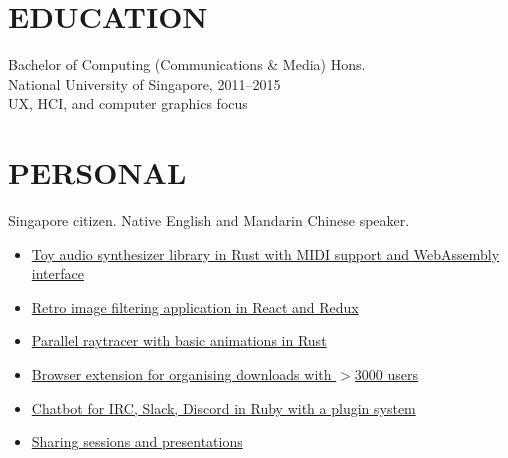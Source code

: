 \documentclass[line, margin]{res}
\begin{document}
\begin{resume}


    \section{EDUCATION}
        Bachelor of Computing (Communications \& Media) Hons. \\
        National University of Singapore, 2011--2015 \\
        UX, HCI, and computer graphics focus

    \section{PERSONAL}
        Singapore citizen. Native English and Mandarin Chinese speaker.
        \vspace{0.075cm}
        \begin{itemize}[leftmargin=*]
        \itemsep0em 
        \item \href{https://github.com/gyng/synthrs}{Toy audio synthesizer library in Rust with MIDI support and WebAssembly interface}
        \item \href{https://github.com/gyng/ditherer}{Retro image filtering application in React and Redux}
        \item \href{https://github.com/gyng/rust-raytracer}{Parallel raytracer with basic animations in Rust}
        \item \href{https://github.com/gyng/save-in}{Browser extension for organising downloads with $>$3000 users}
        \item \href{https://github.com/gyng/betabot}{Chatbot for IRC, Slack, Discord in Ruby with a plugin system}
        \item \href{https://github.com/gyng/book}{Sharing sessions and presentations}
        \end{itemize}


\end{resume}
\end{document}
